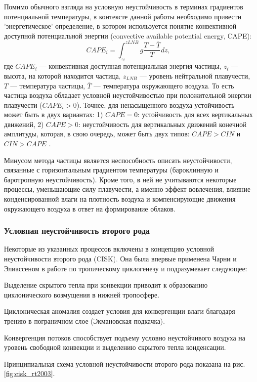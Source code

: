 \documentclass[12pt,a4paper]{report}
\begin{document}
Помимо обычного взгляда на условную неустойчивость в терминах градиентов потенциальной температуры, в контексте данной работы необходимо привести 'энергетическое' определение, в котором используется понятие конвективной доступной потенциальной энергии (convective available potential energy, CAPE):
\begin{equation}
CAPE_i = \int_{z_{i}}^{z{LNB}} g\frac{T-\overline{T}}{T}dz,
\end{equation}
где $CAPE_i$ --- конвективная доступная потенциальная энергия частицы, $z_{i}$ --- высота, на которой находится частица, $z_{LNB}$ --- уровень нейтральной плавучести, $T$ --- температура частицы, $\overline{T}$ --- температура окружающего воздуха. То есть частица воздуха обладает условной неустойчивостью при положительной энергии плавучести ($CAPE_i>0$). Точнее, для ненасыщенного воздуха устойчивость может быть в двух вариантах: 1) $CAPE=0$: устойчивость для всех вертикальных движений, 2) $CAPE>0$: неустойчивость для вертикальных движений конечной амплитуды, которая, в свою очередь, может быть двух типов: $CAPE>CIN$ и $CIN>CAPE$ \citep{Lin2007}.

Минусом метода частицы является неспособность описать неустойчивости, связанные с горизонтальным градиентом температуры (бароклинную и баротропную неустойчивость). Кроме того, в ней не учитываются некоторые процессы, уменьшающие силу плавучести, а именно эффект вовлечения, влияние конденсированной влаги на плотность воздуха и компенсирующие движения окружающего воздуха в ответ на формирование облаков.

\subsubsection{Условная неустойчивость второго рода}
Некоторые из указанных процессов включены в концепцию условной неустойчивости второго рода (CISK). Она была впервые применена Чарни и Элиассеном в работе по тропическому циклогенезу и подразумевает следующее:
\begin{sqlist} 
\item Выделение скрытого тепла при конвекции приводит к образованию циклонического возмущения в нижней тропосфере.
\item Циклоническая аномалия создает условия для конвергенции влаги благодаря трению в пограничном слое (Экмановская подкачка).
\item Конвергенция потоков способствует подъему условно неустойчивого воздуха на уровень свободной конвекции и выделению скрытого тепла конденсации.
\end{sqlist}
Принципиальная схема условной неустойчивости второго рода показана на рис. \ref{fig:cisk_rt2003}.
\end{document}
